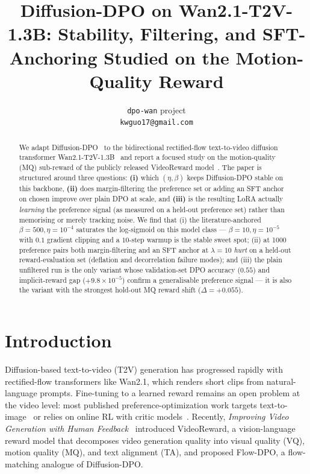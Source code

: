 \documentclass{article}
\title{Diffusion-DPO on Wan2.1-T2V-1.3B: Stability, Filtering, and SFT-Anchoring Studied on the Motion-Quality Reward}
\author{%
  \texttt{dpo-wan} project\\
  \texttt{kwguo17@gmail.com}
}
\begin{document}
\maketitle

\begin{abstract}
We adapt Diffusion-DPO~\cite{wallace2023dpo} to the bidirectional rectified-flow text-to-video diffusion transformer Wan2.1-T2V-1.3B~\cite{wan2024} and report a focused study on the motion-quality (MQ) sub-reward of the publicly released VideoReward model~\cite{liu2025improving}.  The paper is structured around three questions: \textbf{(i)} which $(\eta, \beta)$ keeps Diffusion-DPO stable on this backbone, \textbf{(ii)} does margin-filtering the preference set or adding an SFT anchor on chosen improve over plain DPO at scale, and \textbf{(iii)} is the resulting LoRA actually \emph{learning} the preference signal (as measured on a held-out preference set) rather than memorising or merely tracking noise.  We find that (i) the literature-anchored $\beta{=}500, \eta{=}10^{-4}$ saturates the log-sigmoid on this model class --- $\beta{=}10, \eta{=}10^{-5}$ with $0.1$ gradient clipping and a $10$-step warmup is the stable sweet spot; (ii) at 1000 preference pairs both margin-filtering and an SFT anchor at $\lambda{=}10$ \emph{hurt} on a held-out reward-evaluation set (deflation and decorrelation failure modes); and (iii) the plain unfiltered run is the only variant whose validation-set DPO accuracy ($0.55$) and implicit-reward gap ($+9.8{\times}10^{-5}$) confirm a generalisable preference signal --- it is also the variant with the strongest hold-out MQ reward shift ($\Delta {=} +0.055$).
\end{abstract}

\section{Introduction}
Diffusion-based text-to-video (T2V) generation has progressed rapidly with rectified-flow transformers like Wan2.1, which renders short clips from natural-language prompts.  Fine-tuning to a learned reward remains an open problem at the video level: most published preference-optimization work targets text-to-image~\cite{wallace2023dpo,yang2024dense} or relies on online RL with critic models~\cite{black2024ddpo,fan2024reinforcement}.  Recently, \emph{Improving Video Generation with Human Feedback}~\cite{liu2025improving} introduced VideoReward, a vision-language reward model that decomposes video generation quality into visual quality (VQ), motion quality (MQ), and text alignment (TA), and proposed Flow-DPO, a flow-matching analogue of Diffusion-DPO.
\end{document}
